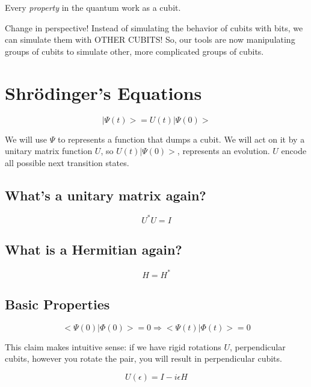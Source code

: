 \documentclass[letterpaper]{article}
\begin{document}
Every \emph{property} in the quantum work as a cubit.

Change in perspective! Instead of simulating the behavior of cubits with bits, we can simulate them with OTHER CUBITS! So, our tools are now manipulating groups of cubits to simulate other, more complicated groups of cubits.

\section{Shrödinger's Equations}
\label{sec:org1d800a0}
\begin{equation}
   |\Psi (t) \big> = U(t) | \Psi(0)\big> 
\end{equation}

We will use \(\Psi\) to represents a function that dumps a cubit. We will act on it by a unitary matrix function \(U\), so \(U(t) | \Psi(0) \big>\), represents an evolution. \(U\) encode all possible next transition states.

\subsection{What's a unitary matrix again?}
\label{sec:org5e34e5d}

\begin{equation}
   U^*U = I 
\end{equation}

\subsection{What is a Hermitian again?}
\label{sec:orga08b448}

\begin{equation}
   H = H^* 
\end{equation}

\subsection{Basic Properties}
\label{sec:orgc685904}
\begin{equation}
   \big< \Psi (0) | \Phi (0) \big> = 0  \Rightarrow  \big< \Psi (t) | \Phi (t) \big> = 0
\end{equation}

This claim makes intuitive sense: if we have rigid rotations \(U\), perpendicular cubits, however you rotate the pair, you will result in perpendicular cubits.

\begin{equation}
   U(\epsilon) = I-i\epsilon H 
\end{equation}
\end{document}
